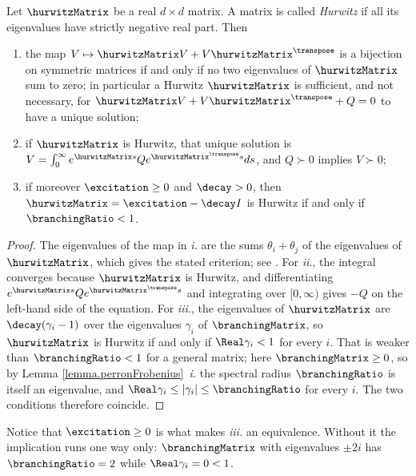 \begin{prop}\label{prop.lyapunovUniqueness}
 Let $\hurwitzMatrix$ be a real $d \times d$ matrix.
 A matrix is called \emph{Hurwitz} if all its eigenvalues have strictly negative real part.
 Then
 \begin{enumerate}[label={\emph{\roman{*}}.}]
  \item the map $V \mapsto \hurwitzMatrix V + V\hurwitzMatrix^{\transpose}$ is a bijection
        on symmetric matrices if and only if no two eigenvalues of $\hurwitzMatrix$ sum to
        zero; in particular a Hurwitz $\hurwitzMatrix$ is sufficient, and not necessary,
        for $\hurwitzMatrix V + V\hurwitzMatrix^{\transpose} + Q = 0$ to have a unique
        solution;
  \item if $\hurwitzMatrix$ is Hurwitz, that unique solution is
        $V = \int_{0}^{\infty} e^{\hurwitzMatrix s} Q e^{\hurwitzMatrix^{\transpose} s} ds$,
        and $Q \succ 0$ implies $V \succ 0$;
  \item if moreover $\excitation \geq 0$ and $\decay > 0$, then
        $\hurwitzMatrix = \excitation - \decay I$ is Hurwitz if and only if
        $\branchingRatio < 1$.
 \end{enumerate}
\end{prop}
\begin{proof}
 The eigenvalues of the map in \emph{i.} are the sums $\theta_i + \theta_j$ of the
 eigenvalues of $\hurwitzMatrix$, which gives the stated criterion;
 see \cite[Theorem 2.4.4.1]{HJ13mat}.
 For \emph{ii.}, the integral converges because $\hurwitzMatrix$ is Hurwitz,
 and differentiating $e^{\hurwitzMatrix s}Qe^{\hurwitzMatrix^{\transpose}s}$ and
 integrating over $[0,\infty)$ gives $-Q$ on the left-hand side of the equation.
 For \emph{iii.}, the eigenvalues of $\hurwitzMatrix$ are $\decay(\gamma_i - 1)$ over the
 eigenvalues $\gamma_i$ of $\branchingMatrix$,
 so $\hurwitzMatrix$ is Hurwitz if and only if $\Real \gamma_i < 1$ for every $i$.
 That is weaker than $\branchingRatio<1$ for a general matrix;
 here $\branchingMatrix \geq 0$, so by Lemma \ref{lemma.perronFrobenius}~\emph{i.}
 the spectral radius $\branchingRatio$ is itself an eigenvalue,
 and $\Real \gamma_i \leq \vert \gamma_i \vert \leq \branchingRatio$ for every $i$.
 The two conditions therefore coincide.
\end{proof}

\begin{remark}
 Notice that $\excitation \geq 0$ is what makes \emph{iii.} an equivalence.
 Without it the implication runs one way only:
 $\branchingMatrix$ with eigenvalues $\pm 2i$ has $\branchingRatio = 2$
 while $\Real\gamma_i = 0 < 1$.
\end{remark}

